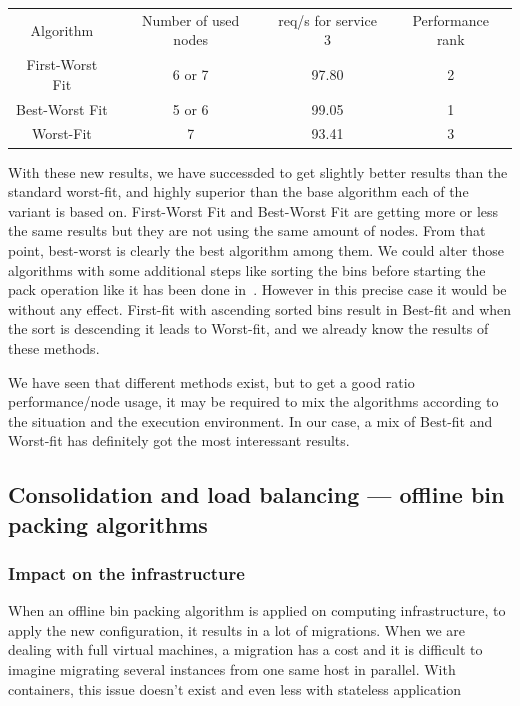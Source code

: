 \vspace{1em}
\begin{tabular}{c | c | c | c}
	Algorithm & Number of used nodes & req/s for service 3 & Performance rank \\
	First-Worst Fit & 6 or 7 & 97.80 & 2 \\
	Best-Worst Fit & 5 or 6 & 99.05 & 1 \\
	Worst-Fit & 7 & 93.41 & 3 \\
\end{tabular}
\vspace{1em}

With these new results, we have successded to get slightly better results than
the standard worst-fit, and highly superior than the base algorithm each of the
variant is based on. First-Worst Fit and Best-Worst Fit are getting more or
less the same results but they are not using the same amount of nodes. From
that point, best-worst is clearly the best algorithm among them.  We could
alter those algorithms with some additional steps like sorting the bins before
starting the pack operation like it has been done
in~\cite{allocationHeterogeneous}.  However in this precise case it would be
without any effect. First-fit with ascending sorted bins result in Best-fit and
when the sort is descending it leads to Worst-fit, and we already know the
results of these methods.

We have seen that different methods exist, but to get a good ratio
performance/node usage, it may be required to mix the algorithms according to
the situation and the execution environment.  In our case, a mix of Best-fit
and Worst-fit has definitely got the most interessant results.

\subsection{Consolidation and load balancing --- offline bin packing algorithms}

\subsubsection{Impact on the infrastructure}

When an offline bin packing algorithm is applied on computing infrastructure,
to apply the new configuration, it results in a lot of migrations. When we are
dealing with full virtual machines, a migration has a cost and it is difficult
to imagine migrating several instances from one same host in parallel. With
containers, this issue doesn't exist and even less with stateless application

